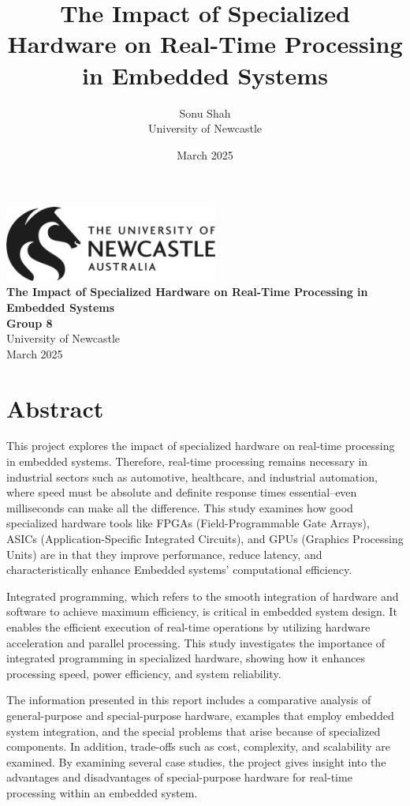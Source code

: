 \documentclass{article}
\title{\textbf{The Impact of Specialized Hardware on Real-Time Processing in Embedded Systems}}
\author{Sonu Shah\\University of Newcastle}
\date{March 2025}
\begin{document}
\begin{titlepage}
    \centering
    \includegraphics[width=7cm]{logos/logo.png}\\[7cm] %
    {\Huge \textbf{The Impact of Specialized Hardware on Real-Time Processing in Embedded Systems}}\\[1cm]
    {\Large \textbf{Group 8}}\\[0.5cm]
    {\large University of Newcastle}\\[0.5cm]
    {\large March 2025}\\[2cm]
    \vfill
\end{titlepage}
\section*{Abstract}

This project explores the impact of specialized hardware on real-time processing in embedded systems. Therefore, real-time processing remains necessary in industrial sectors such as automotive, healthcare, and industrial automation, where speed must be absolute and definite response times essential--even milliseconds can make all the difference. This study examines how good specialized hardware tools like FPGAs (Field-Programmable Gate Arrays), ASICs (Application-Specific Integrated Circuits), and GPUs (Graphics Processing Units) are in that they improve performance, reduce latency, and characteristically enhance Embedded systems' computational efficiency.

Integrated programming, which refers to the smooth integration of hardware and software to achieve maximum efficiency, is critical in embedded system design. It enables the efficient execution of real-time operations by utilizing hardware acceleration and parallel processing. This study investigates the importance of integrated programming in specialized hardware, showing how it enhances processing speed, power efficiency, and system reliability.

The information presented in this report includes a comparative analysis of general-purpose and special-purpose hardware, examples that employ embedded system integration, and the special problems that arise because of specialized components. In addition, trade-offs such as cost, complexity, and scalability are examined. By examining several case studies, the project gives insight into the advantages and disadvantages of special-purpose hardware for real-time processing within an embedded system.
\end{document}
